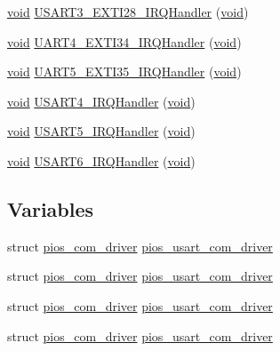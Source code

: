\begin{DoxyCompactItemize}
\item 
\hyperlink{group___n_a_m_e_ga18028b8badbf1ea7e704ccac3c488e82}{void} \hyperlink{group___p_i_o_s___u_s_a_r_t_gaab980dd8a502127dc3ae895e77931bdd}{U\-S\-A\-R\-T3\-\_\-\-E\-X\-T\-I28\-\_\-\-I\-R\-Q\-Handler} (\hyperlink{group___n_a_m_e_ga18028b8badbf1ea7e704ccac3c488e82}{void})
\item 
\hyperlink{group___n_a_m_e_ga18028b8badbf1ea7e704ccac3c488e82}{void} \hyperlink{group___p_i_o_s___u_s_a_r_t_ga552c5d505ae108eef11cd39ebc22773b}{U\-A\-R\-T4\-\_\-\-E\-X\-T\-I34\-\_\-\-I\-R\-Q\-Handler} (\hyperlink{group___n_a_m_e_ga18028b8badbf1ea7e704ccac3c488e82}{void})
\item 
\hyperlink{group___n_a_m_e_ga18028b8badbf1ea7e704ccac3c488e82}{void} \hyperlink{group___p_i_o_s___u_s_a_r_t_ga379570b068a7a67525c68b24831f77fd}{U\-A\-R\-T5\-\_\-\-E\-X\-T\-I35\-\_\-\-I\-R\-Q\-Handler} (\hyperlink{group___n_a_m_e_ga18028b8badbf1ea7e704ccac3c488e82}{void})
\item 
\hyperlink{group___n_a_m_e_ga18028b8badbf1ea7e704ccac3c488e82}{void} \hyperlink{group___p_i_o_s___u_s_a_r_t_gad0d53420fd047695ef9cf3fda8282d9b}{U\-S\-A\-R\-T4\-\_\-\-I\-R\-Q\-Handler} (\hyperlink{group___n_a_m_e_ga18028b8badbf1ea7e704ccac3c488e82}{void})
\item 
\hyperlink{group___n_a_m_e_ga18028b8badbf1ea7e704ccac3c488e82}{void} \hyperlink{group___p_i_o_s___u_s_a_r_t_gaea1a468c29d1d6aba1bba3f58c4b3b7e}{U\-S\-A\-R\-T5\-\_\-\-I\-R\-Q\-Handler} (\hyperlink{group___n_a_m_e_ga18028b8badbf1ea7e704ccac3c488e82}{void})
\item 
\hyperlink{group___n_a_m_e_ga18028b8badbf1ea7e704ccac3c488e82}{void} \hyperlink{group___p_i_o_s___u_s_a_r_t_ga12c827857d907ad0cccd586fd934d446}{U\-S\-A\-R\-T6\-\_\-\-I\-R\-Q\-Handler} (\hyperlink{group___n_a_m_e_ga18028b8badbf1ea7e704ccac3c488e82}{void})
\end{DoxyCompactItemize}
\subsection*{Variables}
\begin{DoxyCompactItemize}
\item 
struct \hyperlink{structpios__com__driver}{pios\-\_\-com\-\_\-driver} \hyperlink{group___p_i_o_s___u_s_a_r_t_gae7414398fe53c376d74ea4c0eecb0670}{pios\-\_\-usart\-\_\-com\-\_\-driver}
\item 
struct \hyperlink{structpios__com__driver}{pios\-\_\-com\-\_\-driver} \hyperlink{group___p_i_o_s___u_s_a_r_t_gae7414398fe53c376d74ea4c0eecb0670}{pios\-\_\-usart\-\_\-com\-\_\-driver}
\item 
struct \hyperlink{structpios__com__driver}{pios\-\_\-com\-\_\-driver} \hyperlink{group___p_i_o_s___u_s_a_r_t_gae7414398fe53c376d74ea4c0eecb0670}{pios\-\_\-usart\-\_\-com\-\_\-driver}
\item 
struct \hyperlink{structpios__com__driver}{pios\-\_\-com\-\_\-driver} \hyperlink{group___p_i_o_s___u_s_a_r_t_gae7414398fe53c376d74ea4c0eecb0670}{pios\-\_\-usart\-\_\-com\-\_\-driver}
\end{DoxyCompactItemize}


